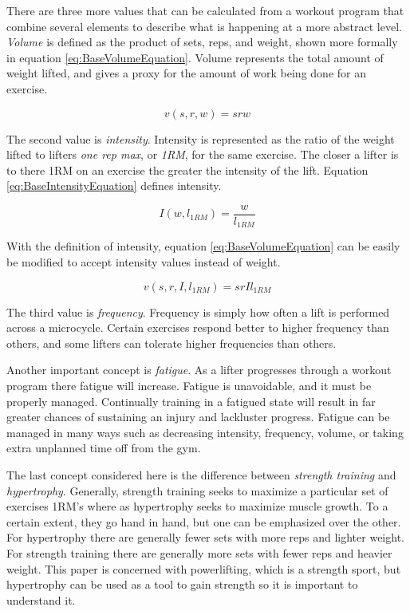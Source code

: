 There are three more values that can be calculated from a workout program that combine several elements to describe what is happening at a more abstract level. \textit{Volume} is defined as the product of sets, reps, and weight, shown more formally in equation \ref{eq:BaseVolumeEquation}. Volume represents the total amount of weight lifted, and gives a proxy for the amount of work being done for an exercise.

\begin{equation}
    \label{eq:BaseVolumeEquation}
    v(s,r,w)=srw
\end{equation}

The second value is \textit{intensity}. Intensity is represented as the ratio of the weight lifted to lifters \textit{one rep max}, or \textit{1RM}, for the same exercise. The closer a lifter is to there 1RM on an exercise the greater the intensity of the lift. Equation \ref{eq:BaseIntensityEquation} defines intensity.

\begin{equation}
    \label{eq:BaseIntensityEquation}
    I(w,l_{1RM})=\frac{w}{l_{1RM}}
\end{equation}

With the definition of intensity, equation \ref{eq:BaseVolumeEquation} can be easily be modified to accept intensity values instead of weight.

\begin{equation}
    \label{eq:IntensityBasedVolumeEquation}
    v(s,r,I,l_{1RM})=srIl_{1RM}
\end{equation}

The third value is \textit{frequency}. Frequency is simply how often a lift is performed across a microcycle. Certain exercises respond better to higher frequency than others, and some lifters can tolerate higher frequencies than others.

Another important concept is \textit{fatigue}. As a lifter progresses through a workout program there fatigue will increase. Fatigue is unavoidable, and it must be properly managed. Continually training in a fatigued state will result in far greater chances of sustaining an injury and lackluster progress. \cite{FATIGUE} Fatigue can be managed in many ways such as decreasing intensity, frequency, volume, or taking extra unplanned time off from the gym.

The last concept considered here is the difference between \textit{strength training} and \textit{hypertrophy}. Generally, strength training seeks to maximize a particular set of exercises 1RM's where as hypertrophy seeks to maximize muscle growth. To a certain extent, they go hand in hand, but one can be emphasized over the other. For hypertrophy there are generally fewer sets with more reps and lighter weight. For strength training there are generally more sets with fewer reps and heavier weight. This paper is concerned with powerlifting, which is a strength sport, but hypertrophy can be used as a tool to gain strength so it is important to understand it.